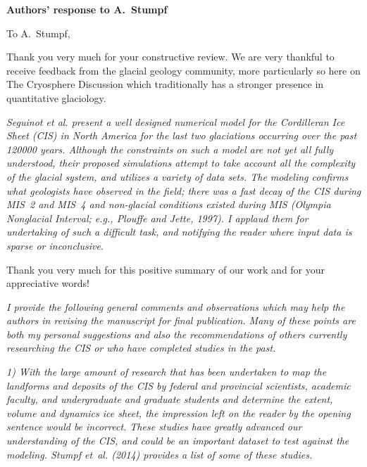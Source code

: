 


\textbf{Authors' response to A.~Stumpf}
\bigskip


\newcommand{\sechead}[1]{\bigskip\noindent\textbf{#1}}
\newcommand{\referee}[1]{\bigskip\textcolor{journalname}{\textit{#1}}}
\newcommand{\msquote}[1]{\begin{quote}\textit{#1}\end{quote}}
\newcommand{\doi}[1]{doi:\allowbreak\href{http://dx.doi.org/#1}{#1}}

To A.~Stumpf,

Thank you very much for your constructive review.
We are very thankful to receive feedback from the glacial geology community,
more particularly so here on The Cryosphere Discussion which traditionally
has a stronger presence in quantitative glaciology.

\referee{%
    Seguinot et al. present a well designed numerical model for the Cordilleran
    Ice Sheet (CIS) in North America for the last two glaciations occurring
    over the past 120000 years. Although the constraints on such a model are
    not yet all fully understood, their proposed simulations attempt to take
    account all the complexity of the glacial system, and utilizes a variety of
    data sets. The modeling confirms what geologists have observed in the
    field; there was a fast decay of the CIS during MIS~2 and MIS~4 and
    non-glacial conditions existed during MIS (Olympia Nonglacial Interval;
    e.g., Plouffe and Jette, 1997). I applaud them for undertaking of
    such a difficult task, and notifying the reader where input data is sparse
    or inconclusive.}

Thank you very much for this positive summary of our work and for your
appreciative words!

\referee{%
    I provide the following general comments and observations which may help
    the authors in revising the manuscript for final publication. Many of these
    points are both my personal suggestions and also the recommendations of
    others currently researching the CIS or who have completed studies in the
    past.}

\referee{%
    1) With the large amount of research that has been undertaken to map the
    landforms and deposits of the CIS by federal and provincial scientists,
    academic faculty, and undergraduate and graduate students and determine the
    extent, volume and dynamics ice sheet, the impression left on the reader by
    the opening sentence would be incorrect. These studies have greatly
    advanced our understanding of the CIS, and could be an important dataset to
    test against the modeling. Stumpf et~al. (2014) provides a list of some
    of these studies.}

